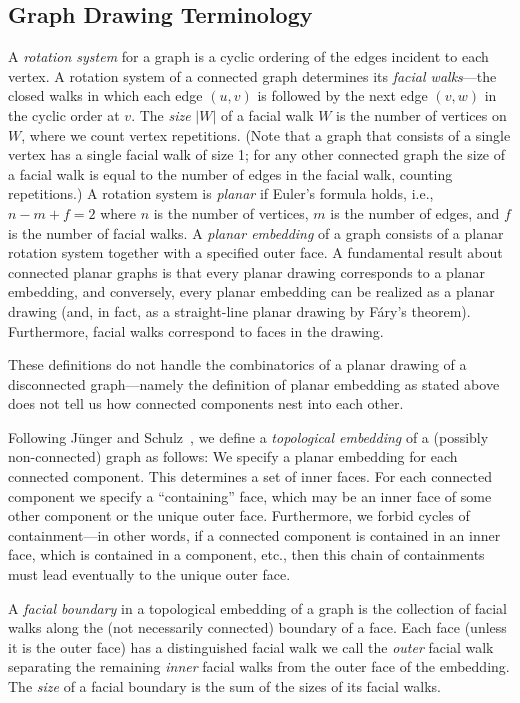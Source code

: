 \documentclass{llncs}
\begin{document}
\subsection{Graph Drawing Terminology}\label{sec:definitions}

A \emph{rotation system} for a graph is a cyclic ordering of the edges incident to each vertex.
A rotation system of a connected graph determines its {\em facial walks}---the closed walks in which each edge $(u,v)$ is followed by the next edge $(v,w)$ in the cyclic order at $v$.
The {\em size} $|W|$ of a facial walk $W$ is the number of vertices on $W$, where we count vertex repetitions.  (Note that a graph that consists of a single vertex has a single facial walk of size 1; for any other connected graph the size of a facial walk is equal to the number of edges in the facial walk, counting repetitions.)
A rotation system is \emph{planar} if Euler's formula holds, i.e., $n - m + f = 2$ where $n$ is the number of vertices, $m$ is the number of edges, and $f$ is the number of facial walks.
A \emph{planar embedding} of a graph consists of a planar rotation system together with a specified outer face.  A fundamental result about connected planar graphs is that every planar drawing corresponds to a planar embedding, and conversely, every planar embedding can be realized as a planar drawing (and, in fact, as a straight-line planar drawing by F\'ary's theorem).
Furthermore, facial walks correspond to faces in the drawing.



These definitions do not handle the combinatorics of a planar drawing of a disconnected graph---namely the definition of planar embedding as stated above does not tell us how connected components nest into each other.



Following  J{\"u}nger and Schulz~\cite{JS}, we
define a \emph{topological embedding} of a (possibly non-connected) graph as follows: We specify a planar embedding for each connected component.  This determines a set of inner faces. For each connected component we specify a ``containing'' face, which may be an inner face of some other component or the unique outer face.   Furthermore, we forbid cycles of containment---in other words, if a connected component is contained in an inner face, which is contained in a component, etc., then this chain of containments must lead eventually to the unique outer face.

A {\em facial boundary} in a topological embedding of a graph is the collection of facial walks along the (not necessarily connected) boundary of a face. Each face (unless it is the outer face) has a distinguished facial walk we call the {\em outer} facial walk separating the remaining {\em inner} facial walks from the outer face of the embedding. The {\em size} of a facial boundary is the sum of the sizes of its facial walks.
\end{document}
